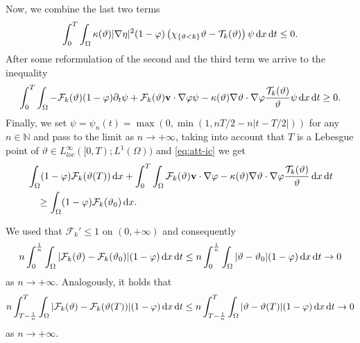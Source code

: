 \documentclass[11pt, a4paper, reqno]{amsart}
\newcommand{\N}{\mathbb N}
\numberwithin{equation}{section}
\newcommand{\dert}{\partial_t}
\newcommand{\vc}[1]{{\bf #1}}
\newcommand{\vv}{\vc{v}}
\newcommand{\thet}{\vartheta}
\newcommand{\dt}{\,{\rm d} t }
\newcommand{\dx}{\,{\rm d} {x}}
\newcommand{\dxdt}{\dx  \dt}
\newcommand{\intO}[1]{\int_{\Omega} #1 \dx}
\newcommand{\intTO}[1]{\int_0^T \int_{\Omega} #1  \dxdt}
\newcommand{\cF}{\mathcal{F}}
\begin{document}
Now, we combine the last two terms
$$
\intTO{\kappa(\thet)|\nabla\eta|^2(1-\varphi)\left( \chi_{\{\thet<k\}}\thet
-\mathcal{T}_k(\thet)\right)\psi}\leq 0.
$$
After some reformulation of the second and the third term we arrive to the inequality
$$
  \intTO{-\cF_k(\thet)(1-\varphi)\dert\psi+\cF_k(\thet)\vv\cdot \nabla\varphi\psi - \kappa(\thet)\nabla\thet \cdot\nabla\varphi \frac{\mathcal{T}_k(\thet)}\thet\psi}\geq 0.
  $$
  Finally, we set $\psi=\psi_n(t)=\max(0,\min(1,nT/2-n|t-T/2|))$ for any $n\in\N$ and pass to the limit as $n\to+\infty$, taking into account that $T$ is a Lebesgue point of $\thet\in L^\infty_{loc}([0,T);L^1(\Omega))$ and \eqref{eq:att-ic} we get
\begin{equation}\label{eq:ent-for-l1}
\begin{split}
  &\intO{(1-\varphi)\cF_k(\thet(T))}+\intTO{\cF_k(\thet)\vv\cdot \nabla\varphi - \kappa(\thet)\nabla\thet \cdot\nabla\varphi \frac{\mathcal{T}_k(\thet)}\thet}\\
  &\quad \geq \intO{(1-\varphi)\cF_k(\thet_0)}.
  \end{split}
\end{equation}

We used that $\cF_k'\leq 1$ on $(0,+\infty)$ and consequently
$$
n\int_0^{\frac1n}\intO{|\cF_k(\thet)-\cF_k(\thet_0)|(1-\varphi)}\dt\leq
n\int_0^{\frac1n}\intO{|\thet-\thet_0|(1-\varphi)}\dt\to 0
$$
as $n\to+\infty$. Analogously, it holds that
$$
n\int_{T-\frac1n}^T\intO{|\cF_k(\thet)-\cF_k(\thet(T))|(1-\varphi)}\dt\leq
n\int_{T-\frac1n}^T\intO{|\thet-\thet(T)|(1-\varphi)}\dt\to 0
$$
as $n\to+\infty$.
\end{document}
